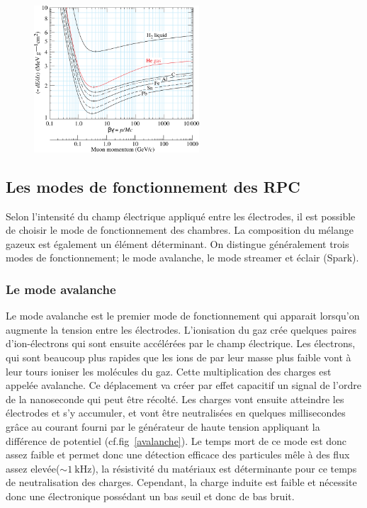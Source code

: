 \begin{figure}[ht!]
	\centering
	\includegraphics[width=0.55\textwidth]{RPC/energylost.png}
	\label{mat}
\end{figure}

\subsection{Les modes de fonctionnement des RPC}

Selon l'intensité du champ électrique appliqué  entre les électrodes, il est possible de choisir le mode de fonctionnement des chambres. La composition du mélange gazeux est également un élément déterminant. On distingue généralement trois modes de fonctionnement; le mode avalanche, le mode streamer et éclair (Spark).

\subsubsection{Le mode avalanche}

Le mode avalanche est le premier mode de fonctionnement qui apparait lorsqu'on augmente la tension entre les électrodes. L'ionisation du gaz crée quelques paires d'ion-électrons qui sont ensuite accélérées par le champ électrique. Les électrons, qui sont beaucoup plus rapides que les ions de par leur masse plus faible vont à leur tours ioniser les molécules du gaz. Cette multiplication des charges est appelée avalanche. Ce déplacement va créer par effet capacitif un signal de l'ordre de la nanoseconde qui peut être récolté. Les charges vont ensuite atteindre les électrodes et s'y accumuler, et vont être neutralisées en quelques millisecondes grâce au courant fourni par le générateur de haute tension appliquant la différence de potentiel (cf.fig~\ref{avalanche}). Le temps mort de ce mode est donc assez faible et permet donc une détection efficace des particules mêle à des flux assez elevée($\sim\SI{1}{\kilo\hertz}$), la résistivité du matériaux est déterminante pour ce temps de neutralisation des charges. Cependant, la charge induite est faible et nécessite donc une électronique possédant un bas seuil et donc de bas bruit.

